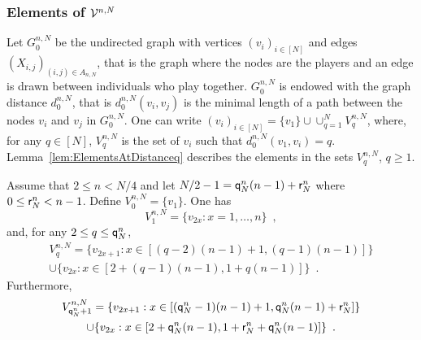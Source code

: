 \subsubsection{Elements of $\mathcal{V}^{n,N}$}
Let $G_0^{n,N}$ be the undirected graph with vertices $(v_i)_{i\in[N]}$ and edges $(X_{i,j})_{ (i,j)\in A_{n,N}}$, that is the graph where the nodes are the players and an edge is drawn between individuals who play together. $G_0^{n,N}$ is endowed with the graph distance $d^{n,N}_0$, that is $d^{n,N}_0(v_i,v_j)$ is the minimal length of a path between the nodes $v_i$ and $v_j$ in $G_0^{n,N}$. One can write $(v_i)_{i\in[N]}=\{v_1\}\cup\cup_{q=1}^{N}V^{n,N}_{q}$, where, for any $q\in[N]$, $V^{n,N}_{q}$ is the set of $v_i$ such that $d^{n,N}_0(v_1,v_i)=q$. Lemma~\ref{lem:ElementsAtDistanceq} describes the elements in the sets $V_{q}^{n,N}$, $q\ge 1$. 
\begin{lemma}\label{lem:ElementsAtDistanceq} Assume that $2\le n<N/4$ and let $N/2-1= {\mathsf{q}}^{n}_{N}(n-1)+{\mathsf{r}}^{n}_{N}$ where $0\le {\mathsf{r}}^{n}_{N}<n-1$. Define $V_{0}^{n,N}=\{v_1\}$. One has
\begin{equation}\label{def:V1}
V_{1}^{n,N}=\{v_{2x} : x=1,\ldots,n\}\enspace, 
\end{equation}
and, for any $2\le q \le {\mathsf{q}}^{n}_{N}$, 
\begin{multline}\label{def:Vq}
V_{q}^{n,N}=\{v_{2x+1} : x\in[(q-2)(n-1)+1,(q-1)(n-1)]\}\\
\cup\{v_{2x} : x\in[2+(q-1)(n-1),1+q(n-1)]\}\enspace.
\end{multline}
Furthermore,
\begin{multline}\label{def:Vq01'}
V_{{\mathsf{q}}^{n}_{N}+1}^{n,N}=\{v_{2x+1} : x\in[({\mathsf{q}}^{n}_{N}-1)(n-1)+1,{\mathsf{q}}^{n}_{N}(n-1)+{\mathsf{r}}^{n}_{N}]\}\\
\cup\{v_{2x} : x\in[2+{\mathsf{q}}^{n}_{N}(n-1),1+{\mathsf{r}}^{n}_{N}+{\mathsf{q}}^{n}_{N}(n-1)]\}\enspace.
\end{multline}
\end{lemma}
